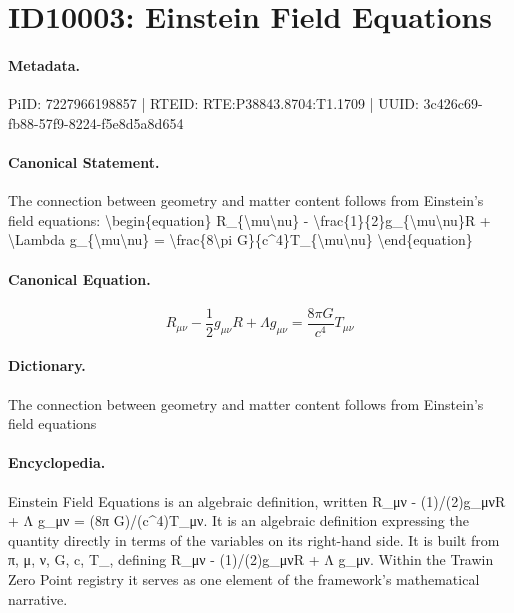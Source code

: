 \section*{ID10003: Einstein Field Equations}
\paragraph{Metadata.}
PiID: 7227966198857 | RTEID: RTE:P38843.8704:T1.1709 | UUID: 3c426c69-fb88-57f9-8224-f5e8d5a8d654

\paragraph{Canonical Statement.}
The connection between geometry and matter content follows from Einstein's field equations: \textbackslash{}begin\{equation\} R\_\{\textbackslash{}mu\textbackslash{}nu\} - \textbackslash{}frac\{1\}\{2\}g\_\{\textbackslash{}mu\textbackslash{}nu\}R + \textbackslash{}Lambda g\_\{\textbackslash{}mu\textbackslash{}nu\} = \textbackslash{}frac\{8\textbackslash{}pi G\}\{c\textasciicircum{}4\}T\_\{\textbackslash{}mu\textbackslash{}nu\} \textbackslash{}end\{equation\}

\paragraph{Canonical Equation.}
\[
R_{\mu\nu} - \frac{1}{2}g_{\mu\nu}R + \Lambda g_{\mu\nu} = \frac{8\pi G}{c^4}T_{\mu\nu}
\]

\paragraph{Dictionary.}
The connection between geometry and matter content follows from Einstein's field equations

\paragraph{Encyclopedia.}
Einstein Field Equations is an algebraic definition, written R\_μν - (1)/(2)g\_μνR + Λ g\_μν = (8π G)/(c\textasciicircum{}4)T\_μν. It is an algebraic definition expressing the quantity directly in terms of the variables on its right-hand side. It is built from π, μ, ν, G, c, T\_, defining R\_μν - (1)/(2)g\_μνR + Λ g\_μν. Within the Trawin Zero Point registry it serves as one element of the framework's mathematical narrative.
